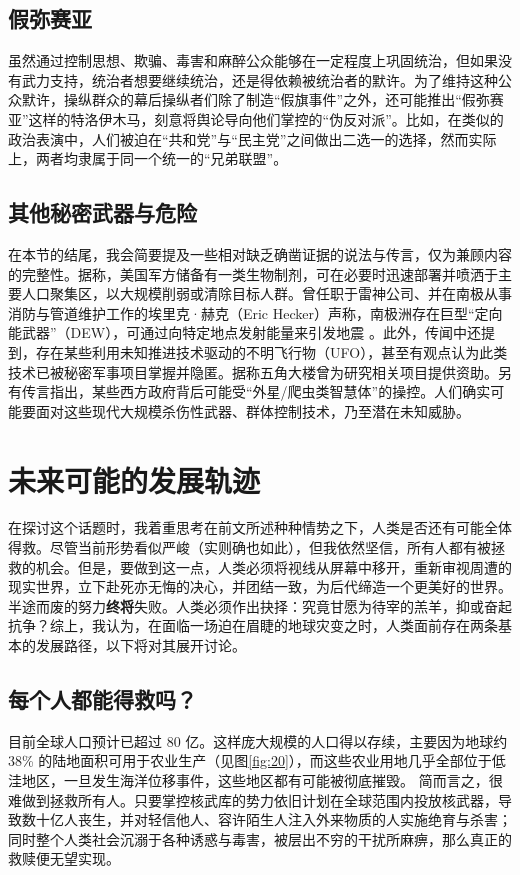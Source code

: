 \documentclass[10pt,twocolumn,letterpaper]{article}
\begin{document}
\subsection{假弥赛亚}
虽然通过控制思想、欺骗、毒害和麻醉公众能够在一定程度上巩固统治，但如果没有武力支持，统治者想要继续统治，还是得依赖被统治者的默许。为了维持这种公众默许，操纵群众的幕后操纵者们除了制造“假旗事件”之外，还可能推出“假弥赛亚”这样的特洛伊木马，刻意将舆论导向他们掌控的“伪反对派”。比如，在类似的政治表演中，人们被迫在“共和党”与“民主党”之间做出二选一的选择，然而实际上，两者均隶属于同一个统一的“兄弟联盟”。

\subsection{其他秘密武器与危险}
在本节的结尾，我会简要提及一些相对缺乏确凿证据的说法与传言，仅为兼顾内容的完整性。据称，美国军方储备有一类生物制剂，可在必要时迅速部署并喷洒于主要人口聚集区，以大规模削弱或清除目标人群。曾任职于雷神公司、并在南极从事消防与管道维护工作的埃里克·赫克（Eric Hecker）声称，南极洲存在巨型“定向能武器”（DEW），可通过向特定地点发射能量来引发地震 \cite{43,44}。此外，传闻中还提到，存在某些利用未知推进技术驱动的不明飞行物（UFO），甚至有观点认为此类技术已被秘密军事项目掌握并隐匿。据称五角大楼曾为研究相关项目提供资助\cite{59}。另有传言指出，某些西方政府背后可能受“外星/爬虫类智慧体”的操控\cite{58,55}。人们确实可能要面对这些现代大规模杀伤性武器、群体控制技术，乃至潜在未知威胁。

\section{未来可能的发展轨迹}

在探讨这个话题时，我着重思考在前文所述种种情势之下，人类是否还有可能全体得救。尽管当前形势看似严峻（实则确也如此），但我依然坚信，所有人都有被拯救的机会。但是，要做到这一点，人类必须将视线从屏幕中移开，重新审视周遭的现实世界，立下赴死亦无悔的决心，并团结一致，为后代缔造一个更美好的世界。半途而废的努力\textbf{终将}失败。人类必须作出抉择：究竟甘愿为待宰的羔羊，抑或奋起抗争？综上，我认为，在面临一场迫在眉睫的地球灾变之时，人类面前存在两条基本的发展路径，以下将对其展开讨论。
\subsection{每个人都能得救吗？}

目前全球人口预计已超过 80 亿\cite{47}。这样庞大规模的人口得以存续，主要因为地球约 38\% 的陆地面积可用于农业生产\cite{46}（见图\ref{fig:20}），而这些农业用地几乎全部位于低洼地区，一旦发生海洋位移事件，这些地区都有可能被彻底摧毁。
简而言之，很难做到拯救所有人。只要掌控核武库的势力依旧计划在全球范围内投放核武器，导致数十亿人丧生，并对轻信他人、容许陌生人注入外来物质的人实施绝育与杀害；同时整个人类社会沉溺于各种诱惑与毒害，被层出不穷的干扰所麻痹，那么真正的救赎便无望实现。
\end{document}
